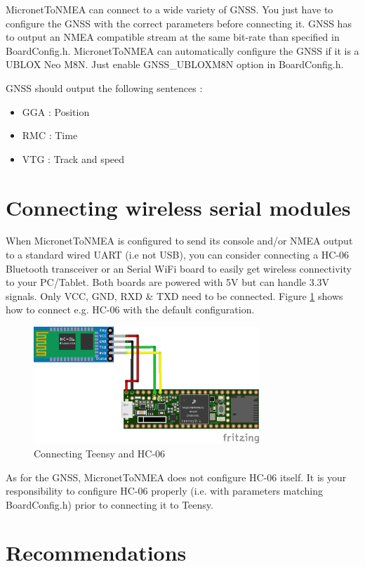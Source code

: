 \documentclass{report}
\begin{document}
MicronetToNMEA can connect to a wide variety of GNSS. You just have to configure the GNSS with the correct parameters before connecting it. GNSS has to output an NMEA compatible stream at the same bit-rate than specified in BoardConfig.h. MicronetToNMEA can automatically configure the GNSS if it is a UBLOX Neo M8N. Just enable GNSS\_UBLOXM8N option in BoardConfig.h.

GNSS should output the following sentences :
\begin{itemize}
	\item GGA : Position
	\item RMC : Time
	\item VTG : Track and speed
\end{itemize}

\section{Connecting wireless serial modules}

When MicronetToNMEA is configured to send its console and/or NMEA
output to a standard wired UART (i.e not USB), you can consider connecting
a HC-06 Bluetooth transceiver or an Serial WiFi board to easily get
wireless connectivity to your PC/Tablet. Both boards are powered with
5V but can handle 3.3V signals. Only VCC, GND, RXD \& TXD need to
be connected. Figure \ref{figure:hc06} shows how to connect e.g.
HC-06 with the default configuration.

\begin{figure}[h]
	\centering
	\includegraphics[width=85mm]{MicronetToNMEA_HC06.png}
	\caption{Connecting Teensy and HC-06}
	\label{figure:hc06}
\end{figure}

As for the GNSS, MicronetToNMEA does not configure HC-06 itself. It is your responsibility to configure HC-06 properly (i.e. with parameters matching BoardConfig.h) prior to connecting it to Teensy.

\section{Recommendations}
\end{document}
